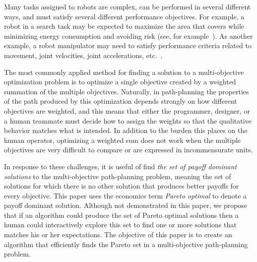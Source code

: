\documentclass{article}
\begin{document}
Many tasks assigned to robots are complex, can be performed in several different ways, and must satisfy several different performance objectives.  
For example, a robot in a search task may be expected to maximize the area that covers while minimizing energy consumption and avoiding risk (see, for example~\cite{yi2014supporting,mei2005deployment}). 
As another example, a robot manipulator may need to satisfy performance criteria  related to movement, joint velocities, joint accelerations, etc.~\cite{Pires2004}.


The most commonly applied method for finding a solution to a multi-objective optimization problem is to optimize a single objective created by a weighted summation of the multiple objectives.  
Naturally, in path-planning the properties of the path produced by this optimization depends strongly on how different objectives are weighted, and this means that either the programmer, designer, or a human teammate must decide how to assign the weights so that the qualitative behavior matches what is intended.  
In addition to the burden this places on the human operator, optimizing a weighted sum does not work when the multiple objectives are very difficult to compare or are expressed in incommensurate units.

In response to these challenges, it is useful of find {\em the set of payoff dominant solutions} to the multi-objective path-planning problem, meaning the set of solutions for which there is no other solution that produces better payoffs for every objective.   
This paper uses the economics term {\em Pareto optimal} to denote a payoff dominant solution.  Although not demonstrated in this paper, we propose that if an algorithm could produce the set of Pareto optimal solutions then a human could interactively explore this set to find one or more solutions that matches his or her expectations. 
The objective of this paper is to create an algorithm that efficiently finds the Pareto set in a multi-objective path-planning problem.
\end{document}
